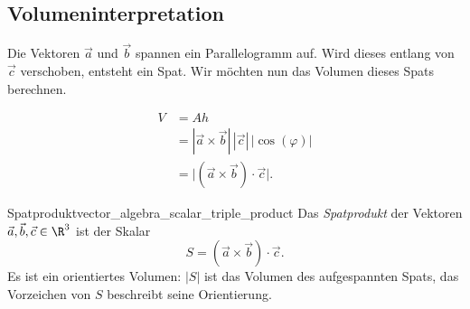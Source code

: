 \subsection{Volumeninterpretation}
\label{subsec:vector_algebra_scalar_triple_product_volume}

Die Vektoren $\vec a$ und $\vec b$ spannen ein Parallelogramm auf. Wird dieses
entlang von $\vec c$ verschoben, entsteht ein Spat. Wir möchten nun das Volumen
dieses Spats berechnen.

\noindent
\begin{minipage}[c]{0.57\linewidth}
  \[
    \begin{aligned}
      V
      &=A h \\
      &=|\vec a\times\vec b|\,|\vec c|\,|\cos(\varphi)|\\
      &=\bigl|(\vec a\times\vec b)\cdot\vec c\bigr|.
    \end{aligned}
  \]
\end{minipage}\hfill
\begin{minipage}[c]{0.39\linewidth}
  \centering
\end{minipage}

\begin{DefinitionBox}{Spatprodukt}{vector_algebra_scalar_triple_product}
  Das \emph{Spatprodukt}  der Vektoren
  $\vec a,\vec b,\vec c\in\R^3$ ist der Skalar
  \[
    S=(\vec a\times\vec b)\cdot\vec c.
  \]
  Es ist ein orientiertes Volumen: $|S|$ ist das Volumen des aufgespannten
  Spats, das Vorzeichen von $S$ beschreibt seine Orientierung.
\end{DefinitionBox}

